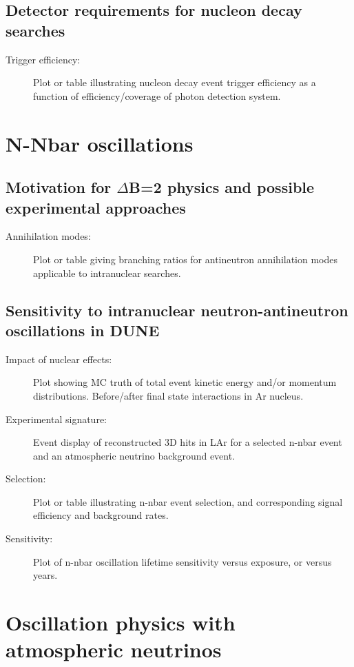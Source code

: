 \subsection{Detector requirements for nucleon decay searches}
\label{subsec:nonaccel-ndk-requirements}

\begin{description}
\item[Trigger efficiency:] Plot or table illustrating nucleon decay event trigger efficiency as a function of efficiency/coverage of photon detection system.
\end{description}


\section{N-Nbar oscillations}
\label{sec:nonaccel-nnbar}

\subsection{Motivation for $\Delta$B=2 physics and possible experimental approaches}
\label{subsec:nonaccel-nnbar-intro}

\begin{description}
\item[Annihilation modes:] Plot or table giving branching ratios for antineutron annihilation modes applicable to intranuclear searches.
\end{description}


\subsection{Sensitivity to intranuclear neutron-antineutron oscillations in DUNE}
\label{subsec:nonaccel-nnbar-dunesensitivity}

\begin{description}
\item[Impact of nuclear effects:] Plot showing MC truth of total event kinetic energy and/or momentum distributions. Before/after final state interactions in Ar nucleus.
\item[Experimental signature:] Event display of reconstructed 3D hits in LAr for a selected n-nbar event and an atmospheric neutrino background event.
\item[Selection:] Plot or table illustrating n-nbar event selection, and corresponding signal efficiency and background rates.
\item[Sensitivity:] Plot of n-nbar oscillation lifetime sensitivity versus exposure, or versus years.
\end{description}


\section{Oscillation physics with atmospheric neutrinos}
\label{sec:nonaccel-atm}


